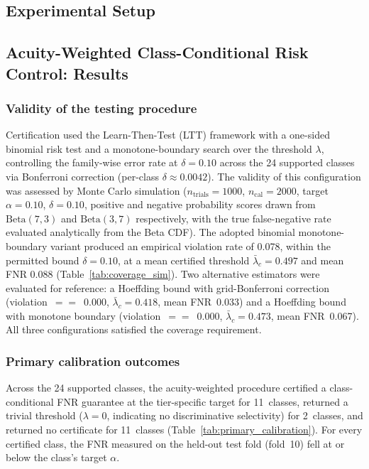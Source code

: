 \subsection{Experimental Setup}

\subsection{Acuity-Weighted Class-Conditional Risk Control: Results}

\subsubsection{Validity of the testing procedure}

Certification used the Learn-Then-Test (LTT) framework with a one-sided binomial
risk test and a monotone-boundary search over the threshold $\lambda$, controlling
the family-wise error rate at $\delta{=}0.10$ across the 24 supported classes via
Bonferroni correction (per-class $\delta\approx 0.0042$).
The validity of this configuration was assessed by Monte Carlo simulation
($n_\mathrm{trials}{=}1000$, $n_\mathrm{cal}{=}2000$, target $\alpha{=}0.10$,
$\delta{=}0.10$, positive and negative probability scores drawn from
$\mathrm{Beta}(7,3)$ and $\mathrm{Beta}(3,7)$ respectively, with the true
false-negative rate evaluated analytically from the Beta CDF).
The adopted binomial monotone-boundary variant produced an empirical violation rate
of 0.078, within the permitted bound $\delta{=}0.10$, at a mean certified threshold
$\bar\lambda_c{=}0.497$ and mean FNR 0.088 (Table~\ref{tab:coverage_sim}).
Two alternative estimators were evaluated for reference: a Hoeffding bound with
grid-Bonferroni correction (violation~$={=}$~0.000, $\bar\lambda_c{=}0.418$, mean
FNR~0.033) and a Hoeffding bound with monotone boundary
(violation~$={=}$~0.000, $\bar\lambda_c{=}0.473$, mean FNR~0.067).
All three configurations satisfied the coverage requirement.

\subsubsection{Primary calibration outcomes}

Across the 24 supported classes, the acuity-weighted procedure certified a
class-conditional FNR guarantee at the tier-specific target for 11~classes,
returned a trivial threshold ($\lambda{=}0$, indicating no discriminative
selectivity) for 2~classes, and returned no certificate for 11~classes
(Table~\ref{tab:primary_calibration}).
For every certified class, the FNR measured on the held-out test fold (fold~10)
fell at or below the class's target $\alpha$.

